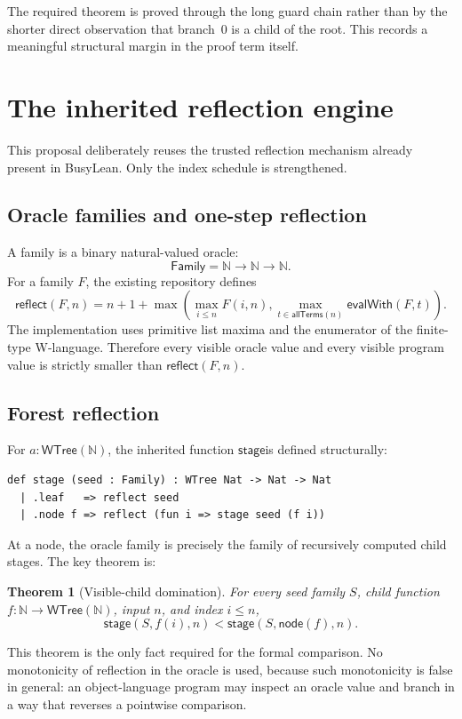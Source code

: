 \documentclass[11pt]{article}
\newtheorem{theorem}{Theorem}
\theoremstyle{definition}
\theoremstyle{remark}
\newcommand{\N}{\ensuremath{\mathbb{N}}}
\newcommand{\WT}{\ensuremath{\mathsf{WTree}}}
\newcommand{\Stage}{\ensuremath{\mathsf{stage}}}
\newcommand{\Reflect}{\ensuremath{\mathsf{reflect}}}
\begin{document}
The required theorem is proved through the long guard chain rather than by the
shorter direct observation that branch~0 is a child of the root.  This records a
meaningful structural margin in the proof term itself.

\section{The inherited reflection engine}

This proposal deliberately reuses the trusted reflection mechanism already
present in BusyLean.  Only the index schedule is strengthened.

\subsection{Oracle families and one-step reflection}

A family is a binary natural-valued oracle:
\[
  \mathsf{Family}=\N\to\N\to\N.
\]
For a family $F$, the existing repository defines
\[
\Reflect(F,n)
 = n+1+
 \max\!\left(
   \max_{i\le n}F(i,n),
   \max_{t\in\mathsf{allTerms}(n)}\mathsf{evalWith}(F,t)
 \right).
\]
The implementation uses primitive list maxima and the enumerator of the
finite-type W-language.  Therefore every visible oracle value and every visible
program value is strictly smaller than \Reflect$(F,n)$.

\subsection{Forest reflection}

For $a:\WT(\N)$, the inherited function \Stage is defined structurally:
\begin{lstlisting}
def stage (seed : Family) : WTree Nat -> Nat -> Nat
  | .leaf   => reflect seed
  | .node f => reflect (fun i => stage seed (f i))
\end{lstlisting}
At a node, the oracle family is precisely the family of recursively computed
child stages.  The key theorem is:
\begin{theorem}[Visible-child domination]
For every seed family $S$, child function $f:\N\to\WT(\N)$, input $n$, and
index $i\le n$,
\[
  \Stage(S,f(i),n)<\Stage(S,\mathsf{node}(f),n).
\]
\end{theorem}

This theorem is the only fact required for the formal comparison.  No
monotonicity of reflection in the oracle is used, because such monotonicity is
false in general: an object-language program may inspect an oracle value and
branch in a way that reverses a pointwise comparison.
\end{document}
